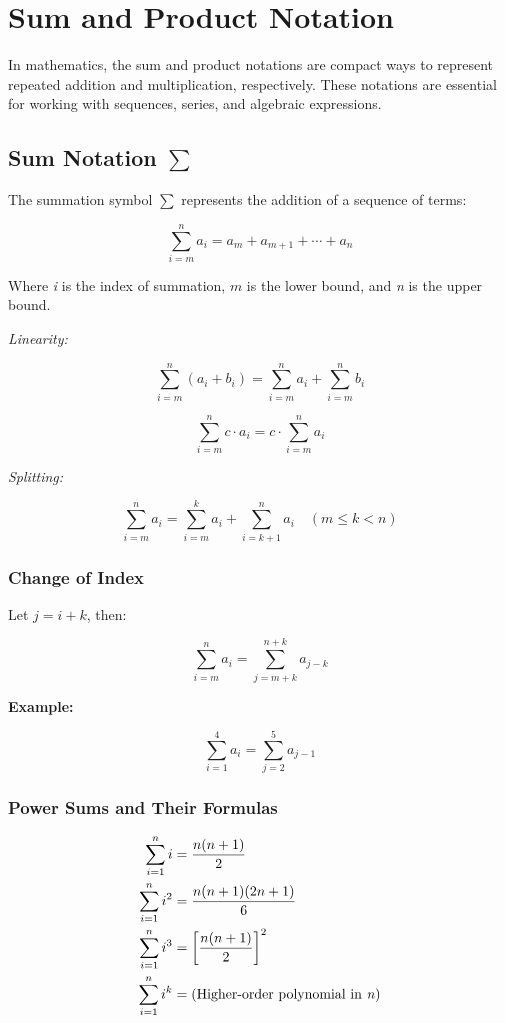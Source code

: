 \newpage
\section{Sum and Product Notation}

In mathematics, the sum and product notations are compact ways to represent repeated addition and 
multiplication, respectively. These notations are essential for working with sequences, series, and 
algebraic expressions.

\subsection{Sum Notation \texorpdfstring{\(\sum\)}{∑}}

The summation symbol \(\sum\) represents the addition of a sequence of terms:

\[
    \sum_{i = m}^{n} a_i = a_m + a_{m+1} + \cdots + a_n
\]

Where \emph{i} is the index of summation, \(m\) is the lower bound, and \emph{n} is the upper bound.
\vspace{\baselineskip}

\emph{Linearity:}

\[
    \sum_{i = m}^{n} (a_i + b_i) = \sum_{i = m}^{n} a_i + \sum_{i = m}^{n} b_i
\]
    
\[
    \sum_{i = m}^{n} c \cdot a_i = c \cdot \sum_{i = m}^{n} a_i
\]

\emph{Splitting:}
    
\[
    \sum_{i = m}^{n} a_i = \sum_{i = m}^{k} a_i + \sum_{i = k+1}^{n} a_i \quad (m \le k < n)
\]

\subsubsection{Change of Index}

Let \(j = i + k\), then:

\[
    \sum_{i = m}^{n} a_i = \sum_{j = m + k}^{n + k} a_{j - k}
\]

\textbf{Example:}
\vspace{\baselineskip}

\[
    \sum_{i = 1}^{4} a_i = \sum_{j = 2}^{5} a_{j - 1}
\]

\subsubsection{Power Sums and Their Formulas}

\begin{align*}
    \sum_{i = 1}^{n} i &= \frac{n(n+1)}{2} \\
    \sum_{i = 1}^{n} i^2 &= \frac{n(n+1)(2n+1)}{6} \\
    \sum_{i = 1}^{n} i^3 &= {\left[\frac{n(n+1)}{2}\right]}^2 \\
    \sum_{i = 1}^{n} i^k &= \text{(Higher-order polynomial in \emph{n})}
\end{align*}

